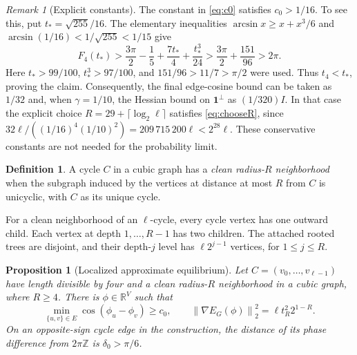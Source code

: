 \documentclass[11pt]{article}
\newtheorem{proposition}[theorem]{Proposition}
\theoremstyle{definition}
\newtheorem{definition}[theorem]{Definition}
\theoremstyle{remark}
\newtheorem{remark}[theorem]{Remark}
\newcommand{\R}{\mathbb R}
\newcommand{\one}{\mathbf 1}
\newcommand{\norm}[1]{\left\lVert#1\right\rVert}
\newcommand{\asin}{\operatorname{arcsin}}
\begin{document}
\begin{remark}[Explicit constants]\label{rem:constants}
The constant in \eqref{eq:c0} satisfies $c_0>1/16$. To see this, put
$t_*=\sqrt{255}/16$. The elementary inequalities
$\asin x\ge x+x^3/6$ and
$\asin(1/16)<1/\sqrt{255}<1/15$ give
\[
 F_4(t_*)>
 \frac{3\pi}{2}-\frac15+\frac{7t_*}{4}+\frac{t_*^3}{24}
 >\frac{3\pi}{2}+\frac{151}{96}>2\pi.
\]
Here $t_*>99/100$, $t_*^3>97/100$, and
$151/96>11/7>\pi/2$ were used. Thus $t_4<t_*$, proving the claim.
Consequently, the final edge-cosine bound can be taken as $1/32$ and,
when $\gamma=1/10$, the Hessian bound on $\one^\perp$ as $(1/320)I$.
In that case the explicit choice
$R=29+\lceil\log_2\ell\rceil$ satisfies \eqref{eq:chooseR}, since
$32\ell/((1/16)^4(1/10)^2)=209\,715\,200\ell<2^{28}\ell$.
These conservative constants are not needed for the probability limit.
\end{remark}

\begin{definition}\label{def:clean}
A cycle $C$ in a cubic graph has a \emph{clean radius-$R$ neighborhood} when
the subgraph induced by the vertices at distance at most $R$ from $C$ is
unicyclic, with $C$ as its unique cycle.
\end{definition}

For a clean neighborhood of an $\ell$-cycle, every cycle vertex has one
outward child. Each vertex at depth $1,\ldots,R-1$ has two children. The
attached rooted trees are disjoint, and their depth-$j$ level has
$\ell2^{j-1}$ vertices, for $1\le j\le R$.

\begin{proposition}[Localized approximate equilibrium]\label{prop:localized}
Let $C=(v_0,\ldots,v_{\ell-1})$ have length divisible by four and a clean
radius-$R$ neighborhood in a cubic graph, where $R\ge4$. There is
$\phi\in\R^V$ such that
\begin{equation}\label{eq:localized-estimates}
 \min_{\{u,v\}\in E}\cos(\phi_u-\phi_v)\ge c_0,
 \qquad \norm{\nabla E_G(\phi)}_2^2=\ell t_R^2 2^{1-R}.
\end{equation}
On an opposite-sign cycle edge in the construction, the distance of its
phase difference from $2\pi\mathbb Z$ is $\delta_0>\pi/6$.
\end{proposition}
\end{document}

